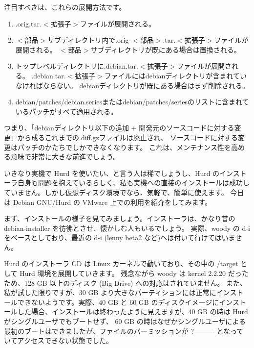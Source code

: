 \documentclass[mingoth,a4paper]{jsarticle}
\begin{document}
\begin{screen}
注目すべきは、これらの展開方法です。

\begin{enumerate}
 \item .orig.tar.$<$拡張子$>$ファイルが展開される。
 \item $<$部品$>$サブディレクトリ内で.orig-$<$部品$>$.tar.$<$拡張子$>$ファイルが展開される。
    $<$部品$>$サブディレクトリが既にある場合は置換される。
 \item トップレベルディレクトリに.debian.tar.$<$拡張子$>$ファイルが展開される。
    .debian.tar.$<$拡張子$>$ファイルにはdebianディレクトリが含まれていなければならない。
    debianディレクトリが既にある場合はまず削除される。
 \item debian/patches/debian.seriesまたはdebian/patches/seriesのリストに含まれているパッチがすべて適用される。
\end{enumerate}

つまり、「debianディレクトリ以下の追加 + 開発元のソースコードに対する変更」から成るこれまでの.diff.gzファイルは廃止され、
ソースコードに対する変更はパッチのかたちでしかできなくなります。
これは、メンテナンス性を高める意味で非常に大きな前進でしょう。
\end{screen}

\label{sec:gnuhurdminnnade}

いきなり実機で Hurd を使いたい、と言う人は稀でしょうし、Hurd のインストーラ自身も問題を抱えているらしく、私も実機への直接のインストールは成功していません。しかし仮想ディスク環境でなら、気軽で、簡単に使えます。
今日は Debian GNU/Hurd の VMware 上での利用を紹介をしてみます。

まず、インストールの様子を見てみましょう。インストーラは、かなり昔の debian-installer を彷彿とさせ、懐かしむ人もいるでしょう。
実際、woody の d-i をベースとしており、最近の d-i (lenny beta2 など)へは付いて行けてはいません。

Hurd のインストーラ CD は Linux カーネルで動いており、その中の /target として Hurd 環境を展開していきます。
残念ながら woody は kernel 2.2.20 だったため、128 GB 以上のディスク (Big Drive) への対応はされていません。
また、私が試した限りですが、30 GB より大きなパーティションには正常にインストールできないようです。実際、40 GB と 60 GB 
のディスクイメージにインストールした場合、インストールは終わったように見えますが、40 GB の時は Hurd がシングルユーザでもブートせず、
60 GB の時はなぜかシングルユーザによる最初のブートはできましたが、ファイルのパーミッションが ?--------- となっていてアクセスできない状態でした。
\end{document}
